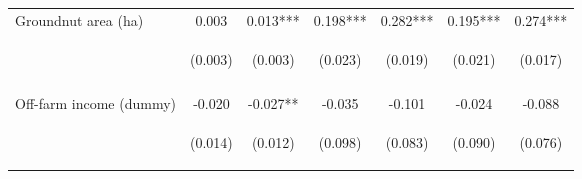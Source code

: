 \begin{center}
\begin{tabular}{lcccccc}
Groundnut area (ha) & 0.003 & 0.013*** & 0.198*** & 0.282*** & 0.195*** & 0.274*** \\
 & \begin{footnotesize}(0.003)\end{footnotesize} & \begin{footnotesize}(0.003)\end{footnotesize} & \begin{footnotesize}(0.023)\end{footnotesize} & \begin{footnotesize}(0.019)\end{footnotesize} & \begin{footnotesize}(0.021)\end{footnotesize} & \begin{footnotesize}(0.017)\end{footnotesize} \\
\vspace{4pt} & \begin{footnotesize}[0.410]\end{footnotesize} & \begin{footnotesize}[0.000]\end{footnotesize} & \begin{footnotesize}[0.000]\end{footnotesize} & \begin{footnotesize}[0.000]\end{footnotesize} & \begin{footnotesize}[0.000]\end{footnotesize} & \begin{footnotesize}[0.000]\end{footnotesize} \\
Off-farm income (dummy) & -0.020 & -0.027** & -0.035 & -0.101 & -0.024 & -0.088 \\
 & \begin{footnotesize}(0.014)\end{footnotesize} & \begin{footnotesize}(0.012)\end{footnotesize} & \begin{footnotesize}(0.098)\end{footnotesize} & \begin{footnotesize}(0.083)\end{footnotesize} & \begin{footnotesize}(0.090)\end{footnotesize} & \begin{footnotesize}(0.076)\end{footnotesize} \\

\end{tabular}
\end{center}
